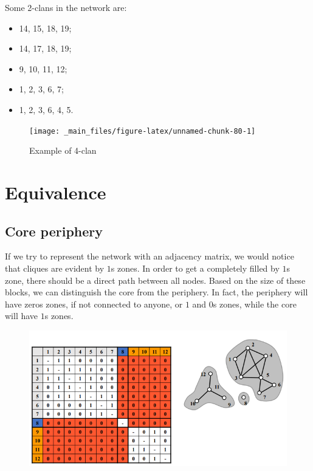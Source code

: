 \documentclass[
  notitlepage,
  onecolumn,
  openany]{book}
\providecommand{\tightlist}{%
  \setlength{\itemsep}{0pt}\setlength{\parskip}{0pt}}
\begin{document}
Some 2-clans in the network are:

\begin{itemize}
\tightlist
\item
  14, 15, 18, 19;
\item
  14, 17, 18, 19;
\item
  9, 10, 11, 12;
\item
  1, 2, 3, 6, 7;
\item
  1, 2, 3, 6, 4, 5.
\end{itemize}

\begin{figure}[h!]

{\centering \texttt{[image: \_main\_files/figure-latex/unnamed-chunk-80-1]} 

}

\caption{Example of 4-clan}\label{fig:unnamed-chunk-80}
\end{figure}

\hypertarget{equivalence}{%
\section{Equivalence}\label{equivalence}}

\hypertarget{core-periphery}{%
\subsection{Core periphery}\label{core-periphery}}

If we try to represent the network with an adjacency matrix, we would notice that cliques are evident by \(1\)s zones. In order to get a completely filled by \(1\)s zone, there should be a direct path between all nodes. Based on the size of these blocks, we can distinguish the core from the periphery. In fact, the periphery will have zeros zones, if not connected to anyone, or \(1\) and \(0\)s zones, while the core will have \(1\)s zones.

\begin{figure}[h!]

{\centering \includegraphics[width=0.6\linewidth]{images/11-Subgroups and Structural Equivalence/Untitled 3} 

}

\end{figure}
\end{document}
